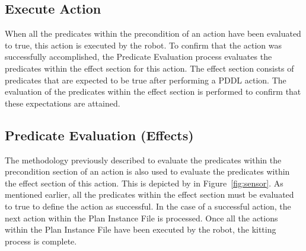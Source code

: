 \subsection{Execute Action}
When all the predicates within the precondition of an action have been evaluated to true, this action is executed by the robot. To confirm that the action was successfully accomplished, the \textsf{Predicate Evaluation} process evaluates the predicates within the effect section for this action. The effect section consists of predicates that are expected to be true after performing a PDDL action. The evaluation of the predicates within the effect section is performed to confirm that these expectations are attained.

\subsection{Predicate Evaluation (Effects)}
The methodology previously described to evaluate the predicates within the precondition section of an action is also used to evaluate the predicates within the effect section of this action. This is depicted by  in Figure~\ref{fig:sensor}. As mentioned earlier, all the predicates within the effect section must be evaluated to true to define the action as successful. In the case of a successful action, the next action within the \textsf{Plan Instance File} is processed. Once all the actions within the \textsf{Plan Instance File} have been executed by the robot, the kitting process is complete.
%
%
